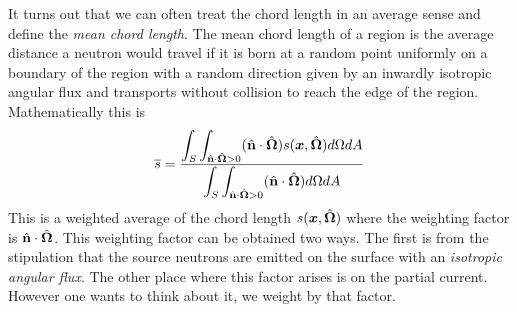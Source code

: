 It turns out that we can often treat the chord length in an average sense and define the \emph{mean chord length}. The mean chord length of a region is the average distance a neutron would travel if it is born at a random point uniformly on a boundary of the region with a random direction given by an inwardly isotropic angular flux and transports without collision to reach the edge of the region. Mathematically this is
\begin{align}
  \overline{s} = \dfrac{  \displaystyle\int_{S} \int_{\hat{\mathbf{n}} \cdot \hat{\mathbf{\Omega}} > 0} ( \hat{\mathbf{n}} \cdot \hat{\mathbf{\Omega}} ) s( \bm{x}, \hat{\mathbf{\Omega}} ) d\Omega dA }{ \displaystyle\int_{S} \int_{\hat{\mathbf{n}} \cdot \hat{\mathbf{\Omega}} > 0} ( \hat{\mathbf{n}} \cdot \hat{\mathbf{\Omega}} ) d\Omega dA  } \label{Eq:thermalization_meanChordLength_definition}
\end{align}
This is a weighted average of the chord length $s(\bm{x},\hat{\mathbf{\Omega}})$ where the weighting factor is $\hat{\mathbf{n}} \cdot \hat{\mathbf{\Omega}}$. This weighting factor can be obtained two ways. The first is from the stipulation that the source neutrons are emitted on the surface with an \emph{isotropic angular flux}. The other place where this factor arises is on the partial current. However one wants to think about it, we weight by that factor.

